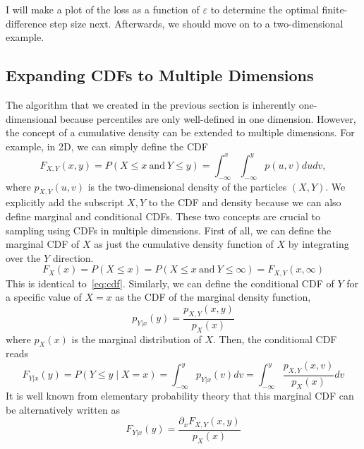 \documentclass{article}
\begin{document}
I will make a plot of the loss as a function of $\varepsilon$ to determine the optimal finite-difference step size next. Afterwards, we should move on to a two-dimensional example.

\subsection{Expanding CDFs to Multiple Dimensions}
The algorithm that we created in the previous section is inherently one-dimensional because percentiles are only well-defined in one dimension. However, the concept of a cumulative density can be extended to multiple dimensions. For example, in 2D, we can simply define the CDF
\begin{equation} \label{eq:cdf_2d}
    F_{X,Y}(x, y) = P\left(X \leq x \ \text{and} \ Y \leq y\right) = \int_{-\infty}^x \int_{-\infty}^y p(u, v) du dv,
\end{equation}
where $p_{X,Y}(u, v)$ is the two-dimensional density of the particles $(X,Y)$. We explicitly add the subscript $X,Y$ to the CDF and density because we can also define marginal and conditional CDFs. These two concepts are crucial to sampling using CDFs in multiple dimensions. First of all, we can define the marginal CDF of $X$ as just the cumulative density function of $X$ by integrating over the $Y$ direction.
\begin{equation} \label{eq:marginal_cdf}
    F_X(x) = P\left(X \leq x\right) = P\left(X \leq x \ \text{and} \ Y \leq \infty\right) = F_{X,Y}(x, \infty)
\end{equation}
This is identical to~\eqref{eq:cdf}. Similarly, we can define the conditional CDF of $Y$ for a specific value of $X = x$ as the CDF of the marginal density function,
\begin{equation}
    p_{Y|x}(y) = \frac{p_{X,Y}(x, y)}{p_X(x)}
\end{equation}
where $p_X(x)$ is the marginal distribution of $X$. Then, the conditional CDF reads
\begin{equation}
    F_{Y|x}(y) = P\left(Y \leq y \mid X = x\right) = \int_{-\infty}^y p_{Y|x}(v) dv = \int_{-\infty}^y \frac{p_{X,Y}(x, v)}{p_X(x)} dv
\end{equation}
It is well known from elementary probability theory that this marginal CDF can be alternatively written as
\begin{equation} \label{eq:conditional_cdf}
    F_{Y|x}(y) = \frac{\partial_x F_{X,Y}(x,y)}{p_X(x)}
\end{equation}
\end{document}

